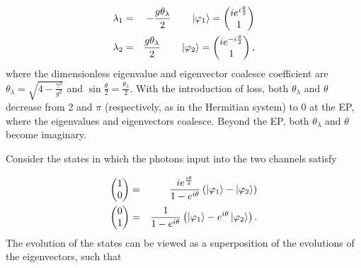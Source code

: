 \documentclass[%
reprint,
superscriptaddress,
amsthm,amsmath,amssymb,
aps,
]{revtex4-1}
\begin{document}
\begin{eqnarray}
	\lambda_{1}&=&-\frac{g\theta_{\lambda}}{2} \qquad \ket{\varphi_{1}}=\begin{pmatrix}
		i e^{i \frac{\theta}{2}} \\ 1	\end{pmatrix}\nonumber\\
	\lambda_{2}&=&\frac{g\theta_{\lambda}}{2}  \qquad \ket{\varphi_{2}}=\begin{pmatrix}
		i e^{-i \frac{\theta}{2}} \\ 1	\end{pmatrix},
\end{eqnarray}
where the dimensionless eigenvalue and eigenvector coalesce coefficient are $\theta_{\lambda}=\sqrt{4- \frac{\gamma^{2}}{g^{2}}} $ and  $\sin\frac{\theta}{2}=\frac{\theta_{\lambda}}{2}$. With the introduction of loss, both $\theta_{\lambda}$ and $\theta$ decrease from 2 and $\pi$ (respectively, as in the Hermitian system) to 0 at the EP, where the eigenvalues and eigenvectors coalesce. Beyond the EP, both $\theta_{\lambda}$ and $\theta$ become imaginary.

Consider the states in which the photons input into the two channels satisfy

\begin{eqnarray}
	\begin{pmatrix} 1 \\ 0	\end{pmatrix}&=& \frac{i e^{\frac{i \theta}{2}}}{ 1-e^{i \theta}} \left( \ket{\varphi_{1}} -\ket{\varphi_{2}}\right)\nonumber\\
	\begin{pmatrix} 0 \\ 1	\end{pmatrix}&=& \frac{1}{ 1-e^{i \theta}} \left(  \ket{\varphi_{1}} -  e^{i \theta} \ket{\varphi_{2}}\right).
\end{eqnarray}
The evolution of the states can be viewed as a superposition of the evolutions of the eigenvectors, such that
\end{document}
